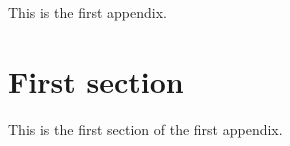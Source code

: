 
This is the first appendix.

\section{First section}

This is the first section of the first appendix.
